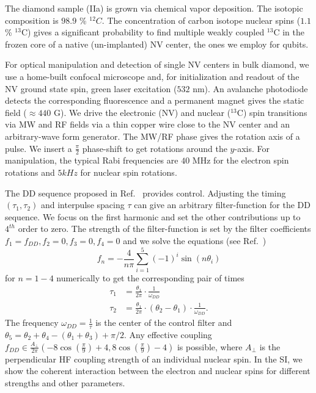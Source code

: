 \documentclass[aps,prl,floatfix,twocolumn,footinbib,superscriptaddress]{revtex4-1}
\begin{document}
The diamond sample (IIa) is grown via chemical vapor deposition. The isotopic composition is $98.9$ \% $^{12}C$. The concentration of carbon isotope nuclear spins ($1.1$ \% $^{13}$C) gives a significant probability to find multiple weakly coupled $^{13}$C in the frozen core of a native (un-implanted) NV center, the ones we employ for qubits.

For optical manipulation and detection of single NV centers in bulk diamond, we use a home-built confocal microscope and, for initialization and readout of the NV ground state spin, green laser excitation ($532$ nm). An avalanche photodiode detects the corresponding fluorescence and a permanent magnet gives the static field ($\approx440$ G). We drive the electronic (NV) and nuclear ($^{13}$C) spin transitions via MW and RF fields via a thin copper wire close to the NV center and an arbitrary-wave form generator. The MW/RF phase gives the rotation axis of a pulse. We insert a $\frac{\pi}{2}$ phase-shift to get rotations around the $y$-axis. For manipulation, the typical Rabi frequencies are $40$ MHz for the electron spin rotations and $5kHz$ for nuclear spin rotations.

The DD sequence proposed in Ref.~\cite{Cas2015} provides control. Adjusting the timing $(\tau_1,\tau_2)$ and interpulse spacing $\tau$ can give an arbitrary filter-function for the DD sequence. We focus on the first harmonic and set the other contributions up to $4^{th}$ order to zero. The strength of the filter-function is set by the filter coefficients  $f_1=f_{DD},f_2=0,f_3=0,f_4=0$ and we solve the equations (see Ref.~\cite{Cas2015})
\begin{equation}
f_n = -\frac{4}{n \pi} \sum_{i=1}^{5} (-1)^i \sin(n \theta_i)
\end{equation}
for $n=1-4$ numerically to get the corresponding pair of times 
\begin{align}
\tau_1 &= \frac{\theta_1}{2\pi}\cdot\frac{1}{\omega_{DD}}\\
\tau_2 &= \frac{\theta_1}{2\pi}\cdot\left(\theta_2-\theta_1\right)\cdot\frac{1}{\omega_{DD}}.  
\end{align}
The frequency $\omega_{DD}=\frac{1}{\tau}$ is the center of the control filter and $\theta_5 = \theta_2 + \theta_4 -(\theta_1 + \theta_3) + \pi/2$. Any effective coupling $f_{DD}\in \frac{A_\perp}{2\pi}\left(-8\cos(\frac{\pi}{9})+4,8\cos(\frac{\pi}{9})-4\right)$ is possible, where $A_\perp$ is the perpendicular HF coupling strength of an individual nuclear spin. In the SI, we show the coherent interaction between the electron and nuclear spins for different strengths and other parameters.
\end{document}
